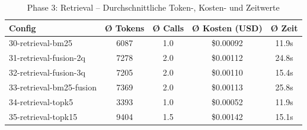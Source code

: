 \begin{table}[H]
\centering
\small
\begin{tabular}{lcccc}
\toprule
Config & Ø Tokens & Ø Calls & Ø Kosten (USD) & Ø Zeit \\
\midrule
30-retrieval-bm25 & 6087 & 1.0 & \$0.00092 & 11.9s \\
31-retrieval-fusion-2q & 7278 & 2.0 & \$0.00112 & 24.8s \\
32-retrieval-fusion-3q & 7205 & 2.0 & \$0.00110 & 15.4s \\
33-retrieval-bm25-fusion & 7369 & 2.0 & \$0.00113 & 25.8s \\
34-retrieval-topk5 & 3393 & 1.0 & \$0.00052 & 11.9s \\
35-retrieval-topk15 & 9404 & 1.5 & \$0.00142 & 15.1s \\
\bottomrule
\end{tabular}
\caption{Phase 3: Retrieval -- Durchschnittliche Token-, Kosten- und Zeitwerte}
\label{tab:phase3_cost}
\end{table}